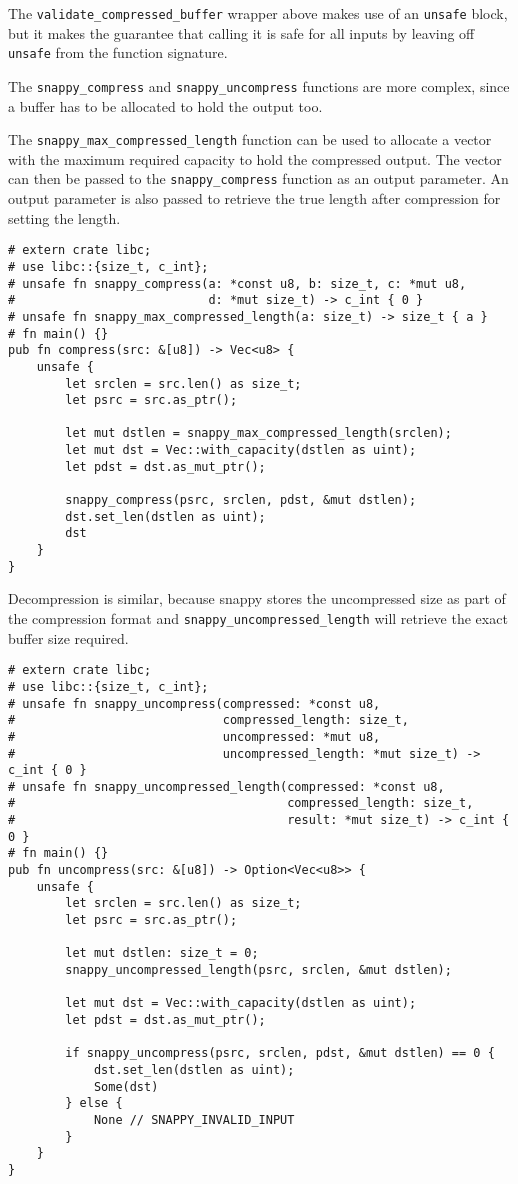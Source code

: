\documentclass[]{article}
\begin{document}
The \texttt{validate\_compressed\_buffer} wrapper above makes use of an
\texttt{unsafe} block, but it makes the guarantee that calling it is
safe for all inputs by leaving off \texttt{unsafe} from the function
signature.

The \texttt{snappy\_compress} and \texttt{snappy\_uncompress} functions
are more complex, since a buffer has to be allocated to hold the output
too.

The \texttt{snappy\_max\_compressed\_length} function can be used to
allocate a vector with the maximum required capacity to hold the
compressed output. The vector can then be passed to the
\texttt{snappy\_compress} function as an output parameter. An output
parameter is also passed to retrieve the true length after compression
for setting the length.

\begin{verbatim}
# extern crate libc;
# use libc::{size_t, c_int};
# unsafe fn snappy_compress(a: *const u8, b: size_t, c: *mut u8,
#                           d: *mut size_t) -> c_int { 0 }
# unsafe fn snappy_max_compressed_length(a: size_t) -> size_t { a }
# fn main() {}
pub fn compress(src: &[u8]) -> Vec<u8> {
    unsafe {
        let srclen = src.len() as size_t;
        let psrc = src.as_ptr();

        let mut dstlen = snappy_max_compressed_length(srclen);
        let mut dst = Vec::with_capacity(dstlen as uint);
        let pdst = dst.as_mut_ptr();

        snappy_compress(psrc, srclen, pdst, &mut dstlen);
        dst.set_len(dstlen as uint);
        dst
    }
}
\end{verbatim}

Decompression is similar, because snappy stores the uncompressed size as
part of the compression format and \texttt{snappy\_uncompressed\_length}
will retrieve the exact buffer size required.

\begin{verbatim}
# extern crate libc;
# use libc::{size_t, c_int};
# unsafe fn snappy_uncompress(compressed: *const u8,
#                             compressed_length: size_t,
#                             uncompressed: *mut u8,
#                             uncompressed_length: *mut size_t) -> c_int { 0 }
# unsafe fn snappy_uncompressed_length(compressed: *const u8,
#                                      compressed_length: size_t,
#                                      result: *mut size_t) -> c_int { 0 }
# fn main() {}
pub fn uncompress(src: &[u8]) -> Option<Vec<u8>> {
    unsafe {
        let srclen = src.len() as size_t;
        let psrc = src.as_ptr();

        let mut dstlen: size_t = 0;
        snappy_uncompressed_length(psrc, srclen, &mut dstlen);

        let mut dst = Vec::with_capacity(dstlen as uint);
        let pdst = dst.as_mut_ptr();

        if snappy_uncompress(psrc, srclen, pdst, &mut dstlen) == 0 {
            dst.set_len(dstlen as uint);
            Some(dst)
        } else {
            None // SNAPPY_INVALID_INPUT
        }
    }
}
\end{verbatim}
\end{document}
